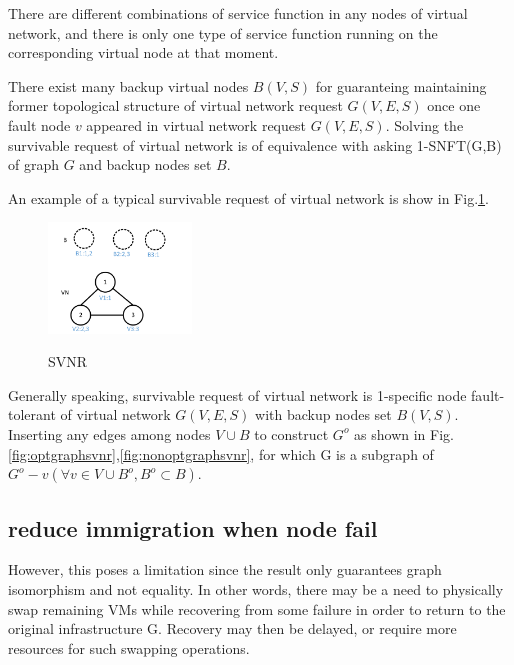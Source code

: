 There are different combinations of service function in any nodes of virtual network, and there is only one type of service function running on the corresponding virtual node at that moment.

There exist many backup virtual nodes $B(V,S)$ for guaranteing maintaining former topological structure of virtual network request $G(V,E,S)$ once one fault node $v$ appeared in virtual network request $G(V,E,S)$. Solving the survivable request of virtual network is of equivalence with asking 1-SNFT(G,B) of graph $G$ and backup nodes set $B$.

An example of a typical survivable request of virtual network is show in Fig.\ref{fig:svnr}.
\begin{figure}
\centering
\includegraphics[width=1.5in]{Fig/SVNR}\\
\caption{SVNR}\label{fig:svnr}
\end{figure}

Generally speaking, survivable request of virtual network is 1-specific node fault-tolerant of virtual network $G(V,E,S)$ with backup nodes set $B(V,S)$. Inserting any edges among nodes $V\cup B$ to construct $G^o$ as shown in Fig.\ref{fig:optgraphsvnr},\ref{fig:nonoptgraphsvnr}, for which G is a subgraph of $G^o-v(\forall v\in V\cup B^o,B^o\subset B)$.

\subsection{reduce immigration when node fail}
However, this poses a limitation since the result only guarantees graph isomorphism and not equality. In other words, there may be a need to physically swap remaining VMs while recovering from some failure in order to return to the original infrastructure G. Recovery may then be delayed, or require more resources for such swapping operations.

